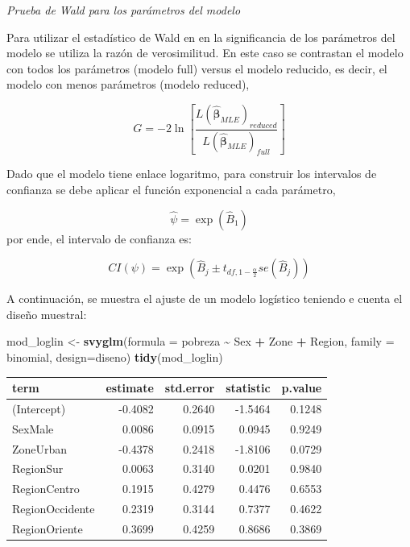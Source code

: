 \documentclass[
  12pt,
]{book}
\newenvironment{Shaded}{\begin{snugshade}}{\end{snugshade}}
\newcommand{\AttributeTok}[1]{\textcolor[rgb]{0.13,0.29,0.53}{#1}}
\newcommand{\FunctionTok}[1]{\textcolor[rgb]{0.13,0.29,0.53}{\textbf{#1}}}
\newcommand{\NormalTok}[1]{#1}
\newcommand{\OtherTok}[1]{\textcolor[rgb]{0.56,0.35,0.01}{#1}}
\newcommand{\SpecialCharTok}[1]{\textcolor[rgb]{0.81,0.36,0.00}{\textbf{#1}}}
\begin{document}
\emph{Prueba de Wald para los parámetros del modelo}

Para utilizar el estadístico de Wald en en la significancia de los parámetros del modelo se utiliza la razón de verosimilitud. En este caso se contrastan el modelo con todos los parámetros (modelo full) versus el modelo reducido, es decir, el modelo con menos parámetros (modelo reduced),

\[
    G=-2\ln\left[\frac{L\left(\hat{\boldsymbol{\beta}}_{MLE}\right)_{reduced}}{L\left(\hat{\boldsymbol{\beta}}_{MLE}\right)_{full}}\right]
\]

Dado que el modelo tiene enlace logaritmo, para construir los intervalos de confianza se debe aplicar el función exponencial a cada parámetro,

\[
    \hat{\psi}=\exp\left(\hat{B}_{1}\right)
\]
por ende, el intervalo de confianza es:

\[
    CI\left(\psi\right)=\exp\left(\hat{B}_{j}\pm t_{df,1-\frac{\alpha}{2}}se\left(\hat{B}_{j}\right)\right)
\]

A continuación, se muestra el ajuste de un modelo logístico teniendo e cuenta el diseño muestral:

\begin{Shaded}
\begin{Highlighting}[]
\NormalTok{  mod\_loglin }\OtherTok{\textless{}{-}} \FunctionTok{svyglm}\NormalTok{(}\AttributeTok{formula =}\NormalTok{ pobreza }\SpecialCharTok{\textasciitilde{}}\NormalTok{ Sex }\SpecialCharTok{+}\NormalTok{ Zone }\SpecialCharTok{+}\NormalTok{ Region,}
                       \AttributeTok{family =}\NormalTok{ binomial, }
                       \AttributeTok{design=}\NormalTok{diseno)}
  \FunctionTok{tidy}\NormalTok{(mod\_loglin) }
\end{Highlighting}
\end{Shaded}

\begin{tabular}{l|r|r|r|r}
\hline
term & estimate & std.error & statistic & p.value\\
\hline
(Intercept) & -0.4082 & 0.2640 & -1.5464 & 0.1248\\
\hline
SexMale & 0.0086 & 0.0915 & 0.0945 & 0.9249\\
\hline
ZoneUrban & -0.4378 & 0.2418 & -1.8106 & 0.0729\\
\hline
RegionSur & 0.0063 & 0.3140 & 0.0201 & 0.9840\\
\hline
RegionCentro & 0.1915 & 0.4279 & 0.4476 & 0.6553\\
\hline
RegionOccidente & 0.2319 & 0.3144 & 0.7377 & 0.4622\\
\hline
RegionOriente & 0.3699 & 0.4259 & 0.8686 & 0.3869\\
\hline
\end{tabular}
\end{document}
